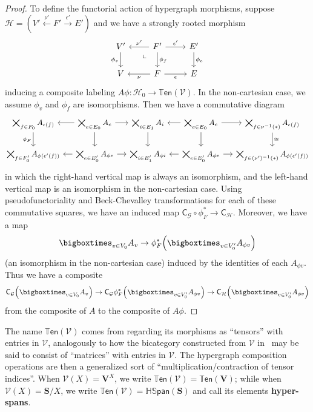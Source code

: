 \documentclass{article}
\theoremstyle{definition}
\theoremstyle{remark}
\def\G{\mathcal{G}}
\def\H{\mathcal{H}}
\def\V{\mathscr{V}}
\def\ten{\mathbb{T}\mathsf{en}}
\def\hspan{\mathbb{HS}\mathsf{pan}}
\newcommand{\dlpullback}[1][dl]{\ar[#1,phantom,near start,"\llcorner"]}
\let\xto\xrightarrow
\let\xot\xleftarrow
\def\bS{\ensuremath{\mathbf{S}}\xspace}
\begin{document}
\begin{proof}
  To define the functorial action of hypergraph morphisms, suppose $\H = (V'\xot{\nu'} F' \xto{\epsilon'} E')$ and we have a strongly rooted morphism
  \[
  \begin{tikzcd}
    V' \ar[d,"\phi_v"'] & F' \ar[d,"\phi_f"] \ar[r,"\epsilon'"] \ar[l,"\nu'"'] \dlpullback[dl] & E' \ar[d,"\phi_e"]\\
    V  & F \ar[r,"\epsilon"'] \ar[l,"\nu"] & E
  \end{tikzcd}
  \]
  inducing a composite labeling $A\phi : \H_0 \to \ten(\V)$.
  In the non-cartesian case, we assume $\phi_v$ and $\phi_f$ are isomorphisms.
  Then we have a commutative diagram
  \[\hspace{-2cm}\small
  \begin{tikzcd}[column sep=small]
    \bigtimes_{f\in F_0} A_{\epsilon(f)} \ar[d,"\phi_F"'] &
    \bigtimes_{e\in E_0} A_e \ar[l] \ar[r] \ar[d] &
    \bigtimes_{i\in E_1} A_{i} \ar[d] &
    \bigtimes_{e\in E_0} A_e \ar[l] \ar[r] \ar[d] &
    \bigtimes_{f\in \nu^{-1}(\ast)} A_{\epsilon(f)} \ar[d,"\cong"] \\
    \bigtimes_{f\in F'_0} A_{\phi(\epsilon'(f))}  &
    \bigtimes_{e\in E'_0} A_{\phi e} \ar[l] \ar[r]  &
    \bigtimes_{i\in E'_1} A_{\phi i}  &
    \bigtimes_{e\in E'_0} A_{\phi e} \ar[l] \ar[r]  &
    \bigtimes_{f\in (\nu')^{-1}(\ast)} A_{\phi(\epsilon'(f))} 
  \end{tikzcd}\hspace{-2cm}
  \]
  in which the right-hand vertical map is always an isomorphism, and the left-hand vertical map is an isomorphism in the non-cartesian case.
  Using pseudofunctoriality and Beck-Chevalley transformations for each of these commutative squares, we have an induced map $\mathsf{C}_\G \circ \phi_F^* \to \mathsf{C}_\H$.
  Moreover, we have a map
  \[ \bigboxtimes_{v\in V_0} A_v \to \phi_F^*\Big(\bigboxtimes_{v\in V'_0} A_{\phi v}\Big)\]
  (an isomorphism in the non-cartesian case) induced by the identities of each $A_{\phi v}$.
  Thus we have a composite
  \[ \mathsf{C}_\G\Big( \bigboxtimes_{v\in V_0} A_v\Big)
  \to \mathsf{C}_\G\phi_F^*\Big(\bigboxtimes_{v\in V'_0} A_{\phi v}\Big)
  \to \mathsf{C}_\H\Big(\bigboxtimes_{v\in V'_0} A_{\phi v}\Big)
  \]
  from the composite of $A$ to the composite of $A\phi$.
\end{proof}

The name $\ten(\V)$ comes from regarding its morphisms as ``tensors'' with entries in $\V$, analogously to how the bicategory constructed from $\V$ in~\cite{shulman:frbi,ps:indexed} may be said to consist of ``matrices'' with entries in $\V$.
The hypergraph composition operations are then a generalized sort of ``multiplication/contraction of tensor indices''.
When $\V(X) = \mathbf{V}^X$, we write $\ten(\V) = \ten(\mathbf{V})$; while when $\V(X) = \bS/X$, we write $\ten(\V) = \hspan(\bS)$ and call its elements \textbf{hyper-spans}.
\end{document}

